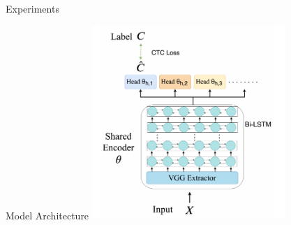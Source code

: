 \documentclass{beamer}
\begin{document}

\begin{frame}
	\begin{center}
    \LARGE{Experiments}
	\end{center}
\end{frame}
\begin{frame}[t]{Model Architecture}
  \center \includegraphics[width=0.55\textwidth]{fig/model_arch.png}
\end{frame}



\end{document}
